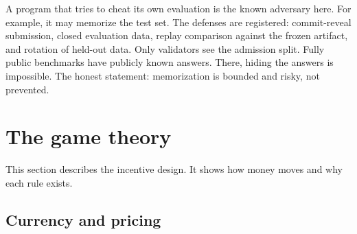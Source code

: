 \documentclass[11pt]{article}
\begin{document}
A program that tries to cheat its own evaluation is the known
adversary here. For example, it may memorize the test set. The
defenses are registered: commit-reveal submission, closed
evaluation data, replay comparison against the frozen artifact,
and rotation of held-out data. Only validators see the admission
split. Fully public benchmarks have publicly known answers. There,
hiding the answers is impossible. The honest statement: memorization is
bounded and risky, not prevented.

\section{The game theory}

This section describes the incentive design. It shows how money
moves and why each rule exists.

\subsection{Currency and pricing}
\end{document}
